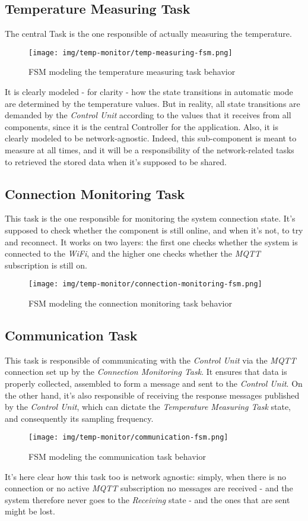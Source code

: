 \documentclass[a4paper,12pt]{report}
\begin{document}
		\subsection{Temperature Measuring Task}
		The central Task is the one responsible of actually measuring the temperature.
		\begin{figure}[H]
			\centering{}
			\texttt{[image: img/temp-monitor/temp-measuring-fsm.png]}
			\caption{FSM modeling the temperature measuring task behavior}
			\label{img:temp-monitor/temp-measuring-fsm}
		\end{figure}
		It is clearly modeled - for clarity - how the state transitions in automatic mode are determined by the temperature values. But in reality, all state transitions are demanded by the \textit{Control Unit} according to the values that it receives from all components, since it is the central Controller for the application.
		\newline Also, it is clearly modeled to be network-agnostic. Indeed, this sub-component is meant to measure at all times, and it will be a responsibility of the network-related tasks to retrieved the stored data when it's supposed to be shared.
		\subsection{Connection Monitoring Task}
		This task is the one responsible for monitoring the system connection state. It's supposed to check whether the component is still online, and when it's not, to try and reconnect. It works on two layers: the first one checks whether the system is connected to the \textit{WiFi}, and the higher one checks whether the \textit{MQTT} subscription is still on.
		\begin{figure}[H]
			\centering{}
			\texttt{[image: img/temp-monitor/connection-monitoring-fsm.png]}
			\caption{FSM modeling the connection monitoring task behavior}
			\label{img:temp-monitor/connection-monitoring-fsm}
		\end{figure}
		\subsection{Communication Task}
		This task is responsible of communicating with the \textit{Control Unit} via the \textit{MQTT} connection set up by the \textit{Connection Monitoring Task}. It ensures that data is properly collected, assembled to form a message and sent to the \textit{Control Unit}. On the other hand, it's also responsible of receiving the response messages published by the \textit{Control Unit}, which can dictate the \textit{Temperature Measuring Task} state, and consequently its sampling frequency.
		\begin{figure}[H]
			\centering{}
			\texttt{[image: img/temp-monitor/communication-fsm.png]}
			\caption{FSM modeling the communication task behavior}
			\label{img:temp-monitor/communication-fsm}
		\end{figure}
		It's here clear how this task too is network agnostic: simply, when there is no connection or no active \textit{MQTT} subscription no messages are received - and the system therefore never goes to the \textit{Receiving} state - and the ones that are sent might be lost.
\end{document}
